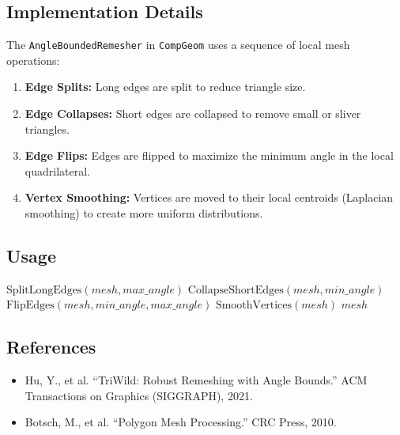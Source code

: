 \subsection{Implementation Details}

The \texttt{AngleBoundedRemesher} in \texttt{CompGeom} uses a sequence of local mesh operations:
\begin{enumerate}
    \item \textbf{Edge Splits:} Long edges are split to reduce triangle size.
    \item \textbf{Edge Collapses:} Short edges are collapsed to remove small or sliver triangles.
    \item \textbf{Edge Flips:} Edges are flipped to maximize the minimum angle in the local quadrilateral.
    \item \textbf{Vertex Smoothing:} Vertices are moved to their local centroids (Laplacian smoothing) to create more uniform distributions.
\end{enumerate}

\subsection{Usage}

\begin{algorithm}
\caption{Angle-Bounded Remesh}
\label{alg:angle_bounded_remesh}
\begin{algorithmic}[1]
        \State $\text{SplitLongEdges}(mesh, max\_angle)$
        \State $\text{CollapseShortEdges}(mesh, min\_angle)$
        \State $\text{FlipEdges}(mesh, min\_angle, max\_angle)$
        \State $\text{SmoothVertices}(mesh)$
    \EndFor
    \State \Return $mesh$
\EndFunction
\end{algorithmic}
\end{algorithm}

\subsection{References}

\begin{itemize}
    \item Hu, Y., et al. ``TriWild: Robust Remeshing with Angle Bounds.'' ACM Transactions on Graphics (SIGGRAPH), 2021.
    \item Botsch, M., et al. ``Polygon Mesh Processing.'' CRC Press, 2010.
\end{itemize}

